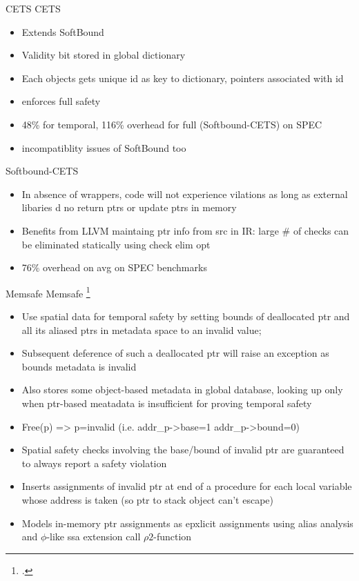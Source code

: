 \begin{frame}{CETS}
  CETS
  \begin{itemize}
    \item Extends SoftBound
    \item Validity bit stored in global dictionary
    \item Each objects gets unique id as key to dictionary, pointers associated with id
    \item enforces full safety
    \item 48\% for temporal, 116\% overhead for full (Softbound-CETS) on SPEC
    \item incompatiblity issues of SoftBound too
   \end{itemize}
\end{frame}

\begin{frame}{Softbound-CETS}
\begin{itemize}
  \item In absence of wrappers, code will not experience vilations as long as external libaries d no return ptrs or update ptrs in memory
  \item Benefits from LLVM maintaing ptr info from src in IR: large \# of checks can be eliminated statically using check elim opt
  \item 76\% overhead on avg on SPEC benchmarks
\end{itemize}
\end{frame}

\begin{frame}{Memsafe}
\footnotesize
    Memsafe \footcite{simpson_memsafe:_2013}
    \begin{itemize}
      \item Use spatial data for temporal safety by setting bounds of deallocated ptr and all its aliased ptrs in metadata space to an invalid value;
      \item Subsequent deference of such a deallocated ptr will raise an exception as bounds metadata is invalid
      \item Also stores some object-based metadata in global database, looking up only when ptr-based meatadata is insufficient for proving temporal safety
      \item Free(p) => p=invalid (i.e. addr\_p->base=1 addr\_p->bound=0)
      \item Spatial safety checks involving the base/bound of invalid ptr are guaranteed to always report a safety violation
      \item Inserts assignments of invalid ptr at end of a procedure for each local variable whose address is taken (so ptr to stack object can't escape)
      \item Models in-memory ptr assignments as epxlicit assignments using alias analysis and $\phi$-like ssa extension call $\rho2$-function
    \end{itemize}
\end{frame}

